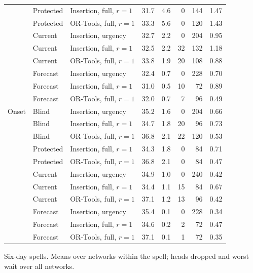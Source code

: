 \begin{table}[!htbp]
\begin{tabular}{lllrrrrr}
 & Protected & Insertion, full, $r = 1$ & 31.7 & 4.6 & 0 & 144 & 1.47 \\
 & Protected & OR-Tools, full, $r = 1$ & 33.3 & 5.6 & 0 & 120 & 1.43 \\
 & Current & Insertion, urgency & 32.7 & 2.2 & 0 & 204 & 0.95 \\
 & Current & Insertion, full, $r = 1$ & 32.5 & 2.2 & 32 & 132 & 1.18 \\
 & Current & OR-Tools, full, $r = 1$ & 33.8 & 1.9 & 20 & 108 & 0.88 \\
 & Forecast & Insertion, urgency & 32.4 & 0.7 & 0 & 228 & 0.70 \\
 & Forecast & Insertion, full, $r = 1$ & 31.0 & 0.5 & 10 & 72 & 0.89 \\
 & Forecast & OR-Tools, full, $r = 1$ & 32.0 & 0.7 & 7 & 96 & 0.49 \\
\addlinespace
Onset & Blind & Insertion, urgency & 35.2 & 1.6 & 0 & 204 & 0.66 \\
 & Blind & Insertion, full, $r = 1$ & 34.7 & 1.8 & 20 & 96 & 0.73 \\
 & Blind & OR-Tools, full, $r = 1$ & 36.8 & 2.1 & 22 & 120 & 0.53 \\
 & Protected & Insertion, full, $r = 1$ & 34.3 & 1.8 & 0 & 84 & 0.71 \\
 & Protected & OR-Tools, full, $r = 1$ & 36.8 & 2.1 & 0 & 84 & 0.47 \\
 & Current & Insertion, urgency & 34.9 & 1.0 & 0 & 240 & 0.42 \\
 & Current & Insertion, full, $r = 1$ & 34.4 & 1.1 & 15 & 84 & 0.67 \\
 & Current & OR-Tools, full, $r = 1$ & 37.1 & 1.2 & 13 & 96 & 0.42 \\
 & Forecast & Insertion, urgency & 35.4 & 0.1 & 0 & 228 & 0.34 \\
 & Forecast & Insertion, full, $r = 1$ & 34.6 & 0.2 & 2 & 72 & 0.47 \\
 & Forecast & OR-Tools, full, $r = 1$ & 37.1 & 0.1 & 1 & 72 & 0.35 \\
\bottomrule
\end{tabular}
\par\smallskip\footnotesize Six-day spells. Means over networks within the spell; heads dropped and worst wait over all networks.
\end{table}
